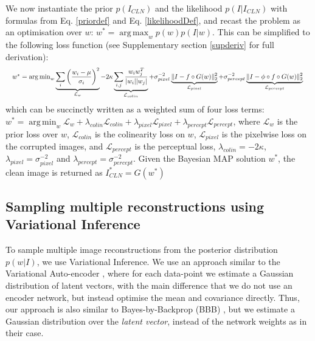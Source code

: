 \documentclass{article}
\DeclarePairedDelimiter{\norm}{\lVert}{\rVert}
\DeclareMathOperator*{\argmin}{arg\,min}
\DeclareMathOperator*{\argmax}{arg\,max}
\newcommand{\ci}[1]{\circ{#1}}
\newcommand{\loss}{\mathcal{L}}
\begin{document}
We now instantiate the prior $p(I_{CLN})$ and the likelihood $p(I|I_{CLN})$ with formulas from Eq. \ref{priordef} and Eq. \ref{likelihoodDef}, and recast the problem as an optimisation over $w$: $ w^* = \argmax_w p(w) p(I|w)$. This can be simplified to the following loss function (see Supplementary section \ref{supderiv} for full derivation):
\begin{equation}
\label{fullloss}
\resizebox{\columnwidth}{!}{$w^* = \argmin_w \underbrace{\sum_i \left(\frac{w_i-\mu}{\sigma_i}\right)^2}_\text{$\loss_w$} - 2\kappa \underbrace{\sum_{i,j} \frac{w_iw_j^T}{|w_i| |w_j|}}_\text{$\loss_{colin}$} + \sigma_{pixel}^{-2} \underbrace{\norm{I - f \ci G(w)}_2^2}_\text{$\loss_{pixel}$} + \sigma_{percept}^{-2} \underbrace{\norm{I - \phi \ci f \ci G(w)}_2^2}_\text{$\loss_{percept}$}$
 }
\end{equation}
which can be succinctly written as a weighted sum of four loss terms: $w^* = \argmin_w  \loss_{w} + \lambda_{colin} \loss_{colin}  +  \lambda_{pixel} \loss_{pixel} + \lambda_{percept} \loss_{percept}$, where $\loss_w$ is the prior loss over $w$, $\loss_{colin}$ is the colinearity loss on $w$, $\loss_{pixel}$ is the pixelwise loss on the corrupted images, and $\loss_{percept}$ is the perceptual loss, $\lambda_{colin} = -2\kappa$, $\lambda_{pixel} = \sigma_{pixel}^{-2}$ and $\lambda_{percept} = \sigma_{percept}^{-2}$. Given the Bayesian MAP solution $w^*$, the clean image is returned as $I_{CLN}^* = G(w^*)$

\subsection{Sampling multiple reconstructions using Variational Inference}
\label{samplingmethod}

To sample multiple image reconstructions from the posterior distribution $p(w|I)$, we use Variational Inference. We use an approach similar to the Variational Auto-encoder \cite{kingma2013auto,rezende2014stochastic}, where for each data-point we estimate a Gaussian distribution of latent vectors, with the main difference that we do not use an encoder network, but instead optimise the mean and covariance directly. Thus, our approach is also similar to Bayes-by-Backprop (BBB) \cite{blundell2015weight}, but we estimate a Gaussian distribution over the \emph{latent vector}, instead of the network weights as in their case.  
\end{document}
